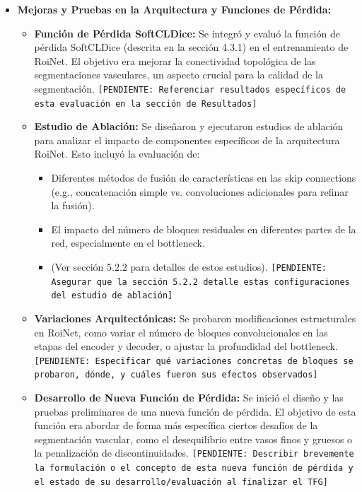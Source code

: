 \documentclass[11pt,a4paper]{report} %
\begin{document}
\begin{itemize}
\begin{itemize}
            \item Se investigaron e implementaron soluciones alternativas para mitigar estos problemas. Un ejemplo notable fue la adaptación y uso del dataset FIVES512 (una versión de FIVES con imágenes redimensionadas a 512x512 píxeles) para permitir una experimentación más ágil y la prueba de un mayor número de configuraciones en nodos locales o con recursos más limitados, antes de escalar a la resolución completa.
        \end{itemize}
    \item \textbf{Mejoras y Pruebas en la Arquitectura y Funciones de Pérdida:}
        \begin{itemize}
            \item \textbf{Función de Pérdida SoftCLDice:} Se integró y evaluó la función de pérdida SoftCLDice (descrita en la sección 4.3.1) en el entrenamiento de RoiNet. El objetivo era mejorar la conectividad topológica de las segmentaciones vasculares, un aspecto crucial para la calidad de la segmentación. \texttt{[PENDIENTE: Referenciar resultados específicos de esta evaluación en la sección de Resultados]}
            \item \textbf{Estudio de Ablación:} Se diseñaron y ejecutaron estudios de ablación para analizar el impacto de componentes específicos de la arquitectura RoiNet. Esto incluyó la evaluación de:
                \begin{itemize}
                    \item Diferentes métodos de fusión de características en las skip connections (e.g., concatenación simple vs. convoluciones adicionales para refinar la fusión).
                    \item El impacto del número de bloques residuales en diferentes partes de la red, especialmente en el bottleneck.
                    \item (Ver sección 5.2.2 para detalles de estos estudios). \texttt{[PENDIENTE: Asegurar que la sección 5.2.2 detalle estas configuraciones del estudio de ablación]}
                \end{itemize}
            \item \textbf{Variaciones Arquitectónicas:} Se probaron modificaciones estructurales en RoiNet, como variar el número de bloques convolucionales en las etapas del encoder y decoder, o ajustar la profundidad del bottleneck. \texttt{[PENDIENTE: Especificar qué variaciones concretas de bloques se probaron, dónde, y cuáles fueron sus efectos observados]}
            \item \textbf{Desarrollo de Nueva Función de Pérdida:} Se inició el diseño y las pruebas preliminares de una nueva función de pérdida. El objetivo de esta función era abordar de forma más específica ciertos desafíos de la segmentación vascular, como el desequilibrio entre vasos finos y gruesos o la penalización de discontinuidades. \texttt{[PENDIENTE: Describir brevemente la formulación o el concepto de esta nueva función de pérdida y el estado de su desarrollo/evaluación al finalizar el TFG]}

\end{itemize}
\end{itemize}
\end{document}
